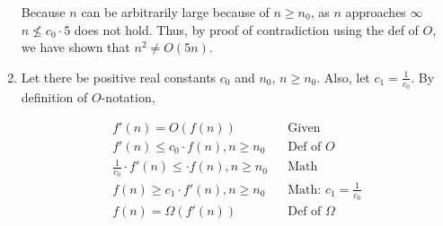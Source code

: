 \documentclass[a4paper]{report}
\begin{document}
\begin{enumerate}
    Because $n$ can be arbitrarily large because of $n \geq n_{0}$, as $n$ approaches $\infty$ $n \nleq c_{0} \cdot 5$ does not hold. 
  Thus, by proof of contradiction using the def of $O$, we have shown that $n^2 \neq O(5n)$.

    \par
    \bigskip
    \setcounter{equation}{0}
    
    \item Let there be positive real constants $c_{0}$ and $n_{0}$, $n \geq n_{0}$. Also, let $c_{1} = \frac{1}{c_{0}}$. By definition of $O$-notation, 

    \begin{align}
      f'(n) = O(f(n))                                   &&\text{Given }\\
      f'(n) \leq c_{0} \cdot f(n), n \geq n_{0}          &&\text{Def of $O$}\\
      \frac{1}{c_{0}} \cdot f'(n) \leq \cdot f(n), n \geq n_{0}          &&\text{Math}\\
      f(n) \geq c_{1} \cdot f'(n), n \geq n_{0}          &&\text{Math: $c_{1} = \frac{1}{c_{0}}$}\\
      f(n)  = \Omega(f'(n))                               &&\text{Def of $\Omega$}\\
    \end{align}


  \end{enumerate}

  
  
\end{document}
